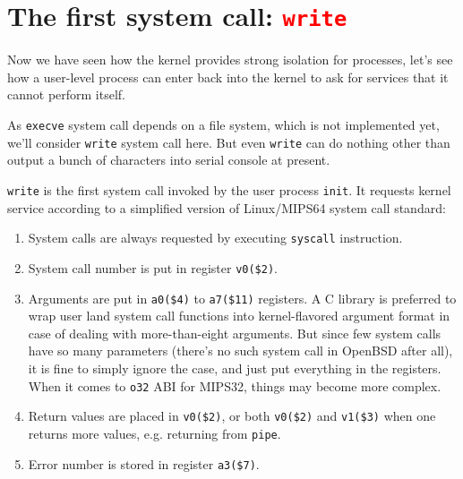 \documentclass{report}
\def \hilite#1{\textcolor{red}{#1}}
\newenvironment{hilight}{\color{red}}{\color{black}}
\begin{document}
	\section{The first system call: \hilite{\texttt{write}}}
	Now we have seen how the kernel provides strong isolation for processes, let's see
	how a user-level process can enter back into the kernel to ask for services that it
	cannot perform itself.
	
	\begin{hilight}
		As \texttt{execve} system call depends on a file system, which is not implemented
		yet, we'll consider \texttt{write} system call here.  But even \texttt{write} can
		do nothing other than output a bunch of characters into serial console at present.

		\texttt{write} is the first system call invoked by the user process \texttt{init}.
		It requests kernel service according to a simplified version of Linux/MIPS64 system
		call standard:
		\begin{enumerate}
			\item System calls are always requested by executing \texttt{syscall} instruction.
			\item System call number is put in register \texttt{v0(\$2)}.
			\item Arguments are put in \texttt{a0(\$4)} to \texttt{a7(\$11)} registers.
			A C library is preferred to wrap user land system call functions into kernel-flavored
			argument format in case of dealing with more-than-eight arguments.  But since few system
			calls have so many parameters (there's no such system call in OpenBSD after all),
			it is fine to simply ignore the case, and just put everything in the registers.
			When it comes to \texttt{o32} ABI for MIPS32, things may become more complex.
			\item Return values are placed in \texttt{v0(\$2)}, or both \texttt{v0(\$2)} and
			\texttt{v1(\$3)} when one returns more values, e.g. returning from \texttt{pipe}.
			\item Error number is stored in register \texttt{a3(\$7)}.
		\end{enumerate}
		

\end{hilight}
\end{document}
